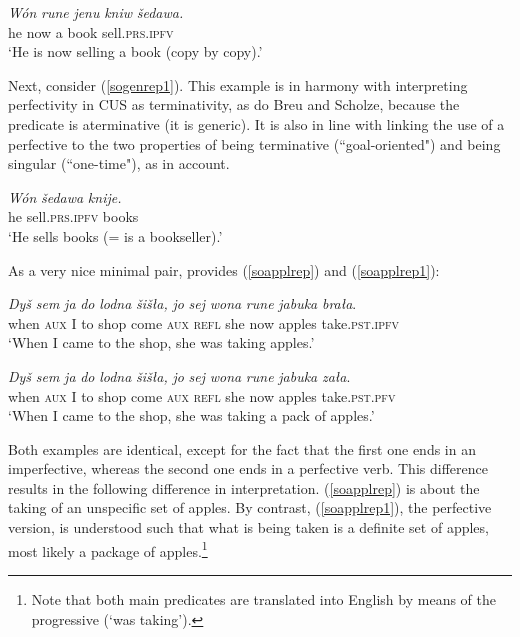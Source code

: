 \documentclass[output=paper,colorlinks,citecolor=brown]{langscibook}
\begin{document}
 \ea\label{sodisrep}
\gll \textit{W\'on} \textit{rune} \textit{jenu} \textit{kniw} \textit{šedawa.} \\
he now a book sell.\textsc{prs.ipfv}\\
\glt \normalsize{`He is now selling a book (copy by copy).'}
\z

\noindent Next, consider (\ref{sogenrep1}). This example is in harmony with interpreting perfectivity in CUS as terminativity, as do Breu and Scholze, because the predicate is aterminative (it is generic). It is also in line with linking the use of a perfective to the two properties of being terminative (``goal-oriented") and being singular (``one-time"), as in  account. 

\ea\label{sogenrep1}
\gll \textit{W\'on} \textit{šedawa} \textit{knije.}\\
he sell.\textsc{prs.ipfv} books\\
\glt \normalsize{`He sells books (= is a bookseller).'}
\z

\noindent As a very nice minimal pair, \citet[59]{Breu2000} provides (\ref{soapplrep}) and (\ref{soapplrep1}):

 \ea\label{soapplrep}
\gll \textit{Dyš} \textit{sem} \textit{ja} \textit{do} \textit{lodna}
\textit{šiš\l{a},} \textit{jo} \textit{sej} \textit{wona} \textit{rune} \textit{jabuka}
\textit{bra\l{a}}. \\
when \textsc{aux} I to shop come \textsc{aux} \textsc{refl} she now apples take.\textsc{pst.ipfv}\\
\glt \normalsize{`When I came to the shop, she was taking apples.'}
\z

 \ea\label{soapplrep1}
\gll \textit{Dyš} \textit{sem} \textit{ja} \textit{do} \textit{lodna}
\textit{šiš\l{a},} \textit{jo} \textit{sej} \textit{wona} \textit{rune} \textit{jabuka}
\textit{za\l{a}}. \\
when \textsc{aux} I to shop come \textsc{aux} \textsc{refl} she now apples take.\textsc{pst.pfv}\\
\glt \normalsize{`When I came to the shop, she was taking a pack of apples.'}
\z

\noindent Both examples are identical, except for the fact that the first one ends in an imperfective, whereas the second one ends in a perfective verb. This difference results in the following difference in interpretation. (\ref{soapplrep}) is about the taking of an unspecific set of apples. By contrast, (\ref{soapplrep1}), the perfective version, is understood such that what is being taken is a definite set of apples, most likely a package of apples.\footnote{Note that both main predicates are translated into English by means of the progressive (`was taking').} 
\end{document}
